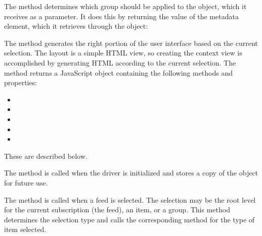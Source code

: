 \documentclass[letterpaper,12pt,english,openany,oneside]{sphinxmanual}
\begin{document}
The  method determines which group should be applied to the  object, which it receives as a parameter. It does this by returning the value of the metadata element, which it retrieves through the  object:

\begin{sphinxVerbatim}[commandchars=\\\{\}]
 
      \PYG{p}{[}\PYG{p}{]}
\end{sphinxVerbatim}

The  method generates the right portion of the user interface based on the current selection. The layout is a simple HTML view, so creating the context view is accomplished by generating HTML according to the current selection. The method returns a JavaScript object containing the following methods and properties:
\begin{itemize}
\item {} 

\item {} 

\item {} 

\item {} 

\item {} 

\end{itemize}

These are described below.

The  method is called when the driver is initialized and stores a copy of the  object for future use.

The  method is called when a feed is selected. The selection may be the root level for the current subscription (the feed), an item, or a group. This method determines the selection type and calls the corresponding method for the type of item selected.
\end{document}
